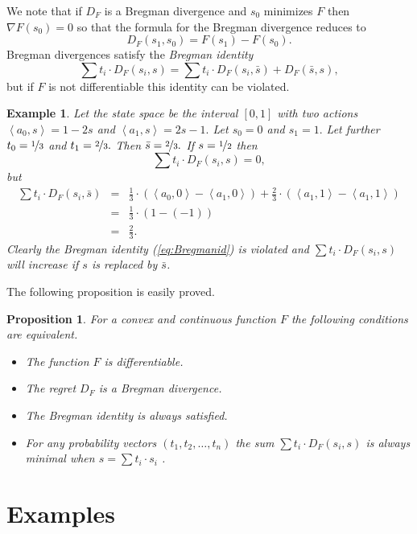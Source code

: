 \documentclass[10pt,a4paper,draft]{article}
\newtheorem{Prop}{Proposition}
\newtheorem{Example}{Example}
\begin{document}
We note that if $D_{F}$ is a Bregman divergence and $s_{0}$
minimizes $F$ then $\nabla F\left(s_{0}\right)=0$ so that the formula for
the Bregman divergence reduces to 
\[
D_{F}\left(s_{1},s_{0}\right)=F\left(s_{1}\right)-F\left(s_{0}\right).
\]
Bregman divergences satisfy the \emph{Bregman identity} 
\begin{equation}\label{eq:Bregmanid}
\sum t_{i}\cdot D_{F}\left(s_{i},s\right)=\sum t_{i}\cdot
D_{F}\left(s_{i},\bar{s}\right)+D_{F}\left(\bar{s},s\right),
\end{equation}
but if $F$ is not differentiable this identity can be violated.
\begin{Example}
Let the state space be the interval $\left[0,1\right]$ with two
actions $\left<a_{0},s\right> = 1-2s$ and $\left<a_{1},s\right> =2s-1.$ Let
$s_{0}=0$ and $s_{1}=1.$ Let further $t_{0}=\nicefrac{1}{3}$ and
$t_{1}=\nicefrac{2}{3}.$ Then $\bar{s}=\nicefrac{2}{3}.$ If $s=\nicefrac{1}{2}$ then 
\[
\sum t_{i}\cdot D_{F}\left(s_{i},s\right)=0,
\]
but 
\begin{eqnarray*}
\sum t_{i}\cdot D_{F}\left(s_{i},\bar{s}\right) & = &
\frac{1}{3}\cdot\left(\left<a_{0},0\right> -\left<a_{1},0\right>\right)+\frac{2}{3}\cdot\left(\left<a_{1},1\right> -\left<a_{1},1\right>\right)\\
 & = & \frac{1}{3}\cdot\left(1-\left(-1\right)\right)\\
 & = & \frac{2}{3}.
\end{eqnarray*}
Clearly the
Bregman identity (\ref{eq:Bregmanid}) is violated and $\sum t_{i}\cdot D_{F}\left(s_{i},s\right)$ will increase if $s$ is replaced by $\bar s $.
\end{Example}
The following proposition is easily proved.
\begin{Prop}
For a convex and continuous function $F$ the following conditions are equivalent.
\begin{itemize}
\item The function $F$ is differentiable.
\item The regret $D_{F}$ is a Bregman divergence.
\item The Bregman identity is always satisfied.
\item For any probability vectors $\left(t_1 , t_2 ,\dots , t_n\right)$ the sum $\sum t_{i}\cdot D_{F}\left(s_{i},s\right)$ is always minimal when $s=\sum t_{i}\cdot s_i$ .
\end{itemize}
\end{Prop}

\section{Examples}
\end{document}
